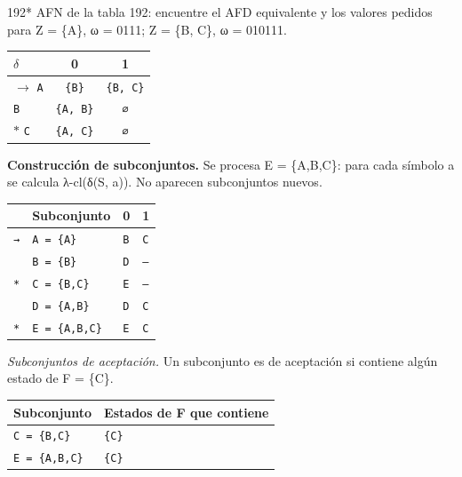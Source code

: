 \documentclass[11pt]{article}
\begin{document}
\begin{ejercicio}{192}{*}
AFN de la tabla 192: encuentre el AFD equivalente y los valores pedidos para Z = \{A\}, ω = 0111; Z = \{B, C\}, ω = 010111.
\end{ejercicio}
\proc \begin{center}\small\begin{tabular}{lcc}\toprule
$\delta$ & 0 & 1 \\\midrule
$\to$ \texttt{A} & \texttt{\{B\}} & \texttt{\{B, C\}} \\
 \texttt{B} & \texttt{\{A, B\}} & \texttt{∅} \\
$*$ \texttt{C} & \texttt{\{A, C\}} & \texttt{∅} \\
\bottomrule\end{tabular}\end{center}
\textbf{Construcción de subconjuntos.} Se procesa E = \{A,B,C\}: para cada símbolo a se calcula λ-cl(δ(S, a)). No aparecen subconjuntos nuevos.
\begin{center}\footnotesize\begin{tabular}{llll}\toprule
 & Subconjunto & 0 & 1 \\\midrule
\texttt{→} & \texttt{A = \{A\}} & \texttt{B} & \texttt{C} \\
\texttt{} & \texttt{B = \{B\}} & \texttt{D} & \texttt{—} \\
\texttt{*} & \texttt{C = \{B,C\}} & \texttt{E} & \texttt{—} \\
\texttt{} & \texttt{D = \{A,B\}} & \texttt{D} & \texttt{C} \\
\texttt{*} & \texttt{E = \{A,B,C\}} & \texttt{E} & \texttt{C} \\
\bottomrule\end{tabular}\end{center}
\textit{Subconjuntos de aceptación.} Un subconjunto es de aceptación si contiene algún estado de F = \{C\}.
\begin{center}\footnotesize\begin{tabular}{ll}\toprule
Subconjunto & Estados de F que contiene \\\midrule
\texttt{C = \{B,C\}} & \texttt{\{C\}} \\
\texttt{E = \{A,B,C\}} & \texttt{\{C\}} \\
\bottomrule\end{tabular}\end{center}
\end{document}
